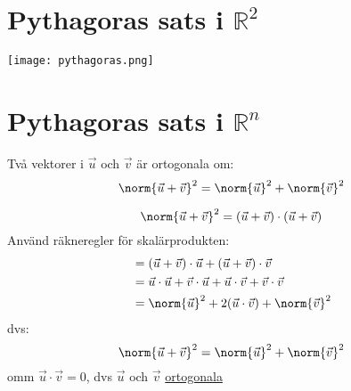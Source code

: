 \section{Pythagoras sats i $\mathbb{R}^2$} %
\label{sec:pythagoras_sats}
\begin{center}
	\texttt{[image: pythagoras.png]}
\end{center}
\newpage
\section{Pythagoras sats i $\mathbb{R}^n$} %
\label{sec:pythagoras_sats_i_}
\begin{sats}
    Två vektorer i $\vec{u}$ och $\vec{v}$ är ortogonala om:
\[
    \norm{\vec{u} + \vec{v}}^2 = \norm{\vec{u}}^2 + \norm{\vec{v}}^2
\]

\end{sats}
\begin{bevis}
	\[
	    \norm{\vec{u} + \vec{v}}^2 = (\vec{u} + \vec{v}) \cdot (\vec{u} + \vec{v})
	\]
	Använd räkneregler för skalärprodukten:
	\begin{align*}
	&= (\vec{u} + \vec{v}) \cdot \vec{u} + (\vec{u} + \vec{v}) \cdot \vec{v} \\
	&= \vec{u} \cdot \vec{u} + \vec{v} \cdot \vec{u} + \vec{u} \cdot \vec{v} + \vec{v} \cdot \vec{v} \\
	&= \norm{\vec{u}}^2+ 2(\vec{u} \cdot \vec{v}) + \norm{\vec{v}}^2
	\end{align*}
	dvs:
	\[
	    \norm{\vec{u} + \vec{v}}^2 = \norm{\vec{u}}^2 + \norm{\vec{v}}^2
	\]
	omm $\vec{u} \cdot \vec{v} = 0$, dvs $\vec{u}$ och $\vec{v}$ \underline{ortogonala}
\end{bevis}

